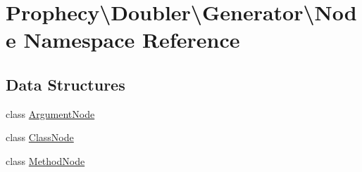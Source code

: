 \hypertarget{namespace_prophecy_1_1_doubler_1_1_generator_1_1_node}{}\section{Prophecy\textbackslash{}Doubler\textbackslash{}Generator\textbackslash{}Node Namespace Reference}
\label{namespace_prophecy_1_1_doubler_1_1_generator_1_1_node}
\subsection*{Data Structures}
\begin{DoxyCompactItemize}
\item 
class \mbox{\hyperlink{class_prophecy_1_1_doubler_1_1_generator_1_1_node_1_1_argument_node}{Argument\+Node}}
\item 
class \mbox{\hyperlink{class_prophecy_1_1_doubler_1_1_generator_1_1_node_1_1_class_node}{Class\+Node}}
\item 
class \mbox{\hyperlink{class_prophecy_1_1_doubler_1_1_generator_1_1_node_1_1_method_node}{Method\+Node}}
\end{DoxyCompactItemize}

